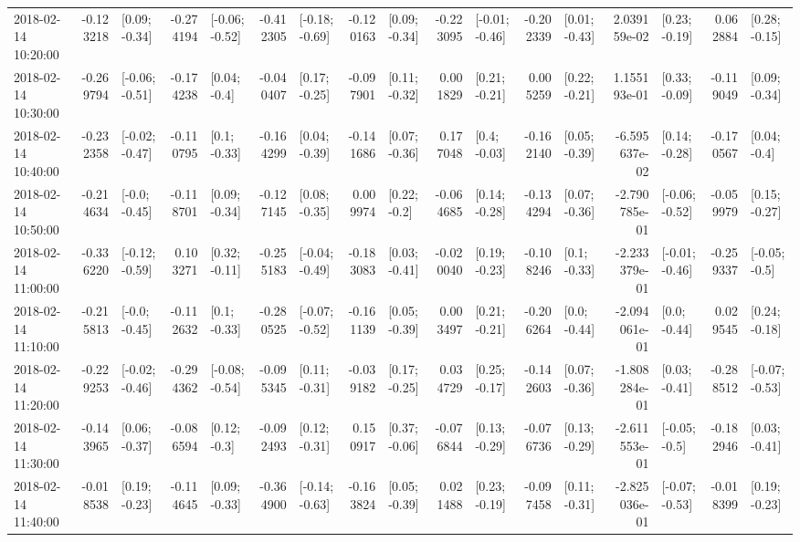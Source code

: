 \begin{tabular}{lrlrlrlrlrlrlrlrl}
2018-02-14 10:20:00 & -0.123218 &   [0.09; -0.34] & -0.274194 &  [-0.06; -0.52] & -0.412305 &  [-0.18; -0.69] & -0.120163 &   [0.09; -0.34] & -0.223095 &  [-0.01; -0.46] & -0.202339 &   [0.01; -0.43] &  2.039159e-02 &   [0.23; -0.19] &  0.062884 &   [0.28; -0.15] \\
2018-02-14 10:30:00 & -0.269794 &  [-0.06; -0.51] & -0.174238 &    [0.04; -0.4] & -0.040407 &   [0.17; -0.25] & -0.097901 &   [0.11; -0.32] &  0.001829 &   [0.21; -0.21] &  0.005259 &   [0.22; -0.21] &  1.155193e-01 &   [0.33; -0.09] & -0.119049 &   [0.09; -0.34] \\
2018-02-14 10:40:00 & -0.232358 &  [-0.02; -0.47] & -0.110795 &    [0.1; -0.33] & -0.164299 &   [0.04; -0.39] & -0.141686 &   [0.07; -0.36] &  0.177048 &    [0.4; -0.03] & -0.162140 &   [0.05; -0.39] & -6.595637e-02 &   [0.14; -0.28] & -0.170567 &    [0.04; -0.4] \\
2018-02-14 10:50:00 & -0.214634 &   [-0.0; -0.45] & -0.118701 &   [0.09; -0.34] & -0.127145 &   [0.08; -0.35] &  0.009974 &    [0.22; -0.2] & -0.064685 &   [0.14; -0.28] & -0.134294 &   [0.07; -0.36] & -2.790785e-01 &  [-0.06; -0.52] & -0.059979 &   [0.15; -0.27] \\
2018-02-14 11:00:00 & -0.336220 &  [-0.12; -0.59] &  0.103271 &   [0.32; -0.11] & -0.255183 &  [-0.04; -0.49] & -0.183083 &   [0.03; -0.41] & -0.020040 &   [0.19; -0.23] & -0.108246 &    [0.1; -0.33] & -2.233379e-01 &  [-0.01; -0.46] & -0.259337 &   [-0.05; -0.5] \\
2018-02-14 11:10:00 & -0.215813 &   [-0.0; -0.45] & -0.112632 &    [0.1; -0.33] & -0.280525 &  [-0.07; -0.52] & -0.161139 &   [0.05; -0.39] &  0.003497 &   [0.21; -0.21] & -0.206264 &    [0.0; -0.44] & -2.094061e-01 &    [0.0; -0.44] &  0.029545 &   [0.24; -0.18] \\
2018-02-14 11:20:00 & -0.229253 &  [-0.02; -0.46] & -0.294362 &  [-0.08; -0.54] & -0.095345 &   [0.11; -0.31] & -0.039182 &   [0.17; -0.25] &  0.034729 &   [0.25; -0.17] & -0.142603 &   [0.07; -0.36] & -1.808284e-01 &   [0.03; -0.41] & -0.288512 &  [-0.07; -0.53] \\
2018-02-14 11:30:00 & -0.143965 &   [0.06; -0.37] & -0.086594 &    [0.12; -0.3] & -0.092493 &   [0.12; -0.31] &  0.150917 &   [0.37; -0.06] & -0.076844 &   [0.13; -0.29] & -0.076736 &   [0.13; -0.29] & -2.611553e-01 &   [-0.05; -0.5] & -0.182946 &   [0.03; -0.41] \\
2018-02-14 11:40:00 & -0.018538 &   [0.19; -0.23] & -0.114645 &   [0.09; -0.33] & -0.364900 &  [-0.14; -0.63] & -0.163824 &   [0.05; -0.39] &  0.021488 &   [0.23; -0.19] & -0.097458 &   [0.11; -0.31] & -2.825036e-01 &  [-0.07; -0.53] & -0.018399 &   [0.19; -0.23] \\

\end{tabular}
